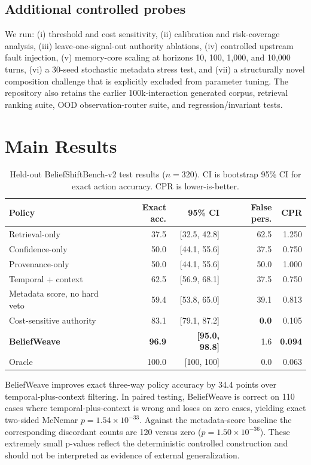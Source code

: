 \documentclass[10pt]{article}
\begin{document}
\subsection{Additional controlled probes}
We run: (i) threshold and cost sensitivity, (ii) calibration and risk-coverage analysis, (iii) leave-one-signal-out authority ablations, (iv) controlled upstream fault injection, (v) memory-core scaling at horizons 10, 100, 1,000, and 10,000 turns, (vi) a 30-seed stochastic metadata stress test, and (vii) a structurally novel composition challenge that is explicitly excluded from parameter tuning. The repository also retains the earlier 100k-interaction generated corpus, retrieval ranking suite, OOD observation-router suite, and regression/invariant tests.

\section{Main Results}
\begin{table}[t]
\centering\small
\caption{Held-out BeliefShiftBench-v2 test results ($n=320$). CI is bootstrap 95\% CI for exact action accuracy. CPR is lower-is-better.}
\begin{tabular}{lrrrr}
\toprule
Policy & Exact acc. & 95\% CI & False pers. & CPR \\
\midrule
Retrieval-only & 37.5 & [32.5, 42.8] & 62.5 & 1.250 \\
Confidence-only & 50.0 & [44.1, 55.6] & 37.5 & 0.750 \\
Provenance-only & 50.0 & [44.1, 55.6] & 50.0 & 1.000 \\
Temporal + context & 62.5 & [56.9, 68.1] & 37.5 & 0.750 \\
Metadata score, no hard veto & 59.4 & [53.8, 65.0] & 39.1 & 0.813 \\
Cost-sensitive authority & 83.1 & [79.1, 87.2] & \textbf{0.0} & 0.105 \\
\textbf{BeliefWeave} & \textbf{96.9} & \textbf{[95.0, 98.8]} & 1.6 & \textbf{0.094} \\
Oracle & 100.0 & [100, 100] & 0.0 & 0.063 \\
\bottomrule
\end{tabular}
\end{table}

BeliefWeave improves exact three-way policy accuracy by 34.4 points over temporal-plus-context filtering. In paired testing, BeliefWeave is correct on 110 cases where temporal-plus-context is wrong and loses on zero cases, yielding exact two-sided McNemar $p=1.54\times10^{-33}$. Against the metadata-score baseline the corresponding discordant counts are 120 versus zero ($p=1.50\times10^{-36}$). These extremely small p-values reflect the deterministic controlled construction and should not be interpreted as evidence of external generalization.
\end{document}
